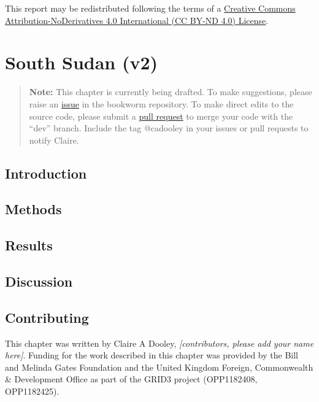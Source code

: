 \documentclass[]{book}
\begin{document}
This report may be redistributed following the terms of a
\href{https://creativecommons.org/licenses/by-nd/4.0/}{Creative Commons
Attribution-NoDerivatives 4.0 International (CC BY-ND 4.0) License}.

\chapter{South Sudan (v2)}\label{south-sudan-v2}

\begin{quote}
\textbf{Note:} This chapter is currently being drafted. To make
suggestions, please raise an
\href{https://github.com/wpgp/bookworm/issues}{issue} in the bookworm
repository. To make direct edits to the source code, please submit a
\href{https://github.com/wpgp/bookworm/pulls}{pull request} to merge
your code with the ``dev'' branch. Include the tag @cadooley in your
issues or pull requests to notify Claire.
\end{quote}

\section{Introduction}\label{introduction-5}

\section{Methods}\label{methods-3}

\section{Results}\label{results-3}

\section{Discussion}\label{discussion-4}

\section*{Contributing}\label{contributing-9}

This chapter was written by Claire A Dooley, \emph{{[}contributors,
please add your name here{]}}. Funding for the work described in this
chapter was provided by the Bill and Melinda Gates Foundation and the
United Kingdom Foreign, Commonwealth \& Development Office as part of
the GRID3 project (OPP1182408, OPP1182425).
\end{document}
